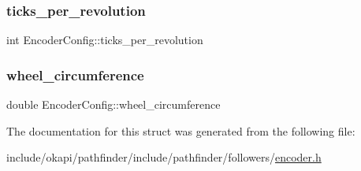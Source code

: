 \mbox{\label{structEncoderConfig_a2e0c8cadba598923ab9862073ad7be81}} 
\subsubsection{\texorpdfstring{ticks\_per\_revolution}{ticks\_per\_revolution}}
{\footnotesize\ttfamily int Encoder\+Config\+::ticks\+\_\+per\+\_\+revolution}

\mbox{\label{structEncoderConfig_af31ada23da9d2b7d4bb7fdaf6877bc00}} 
\subsubsection{\texorpdfstring{wheel\_circumference}{wheel\_circumference}}
{\footnotesize\ttfamily double Encoder\+Config\+::wheel\+\_\+circumference}



The documentation for this struct was generated from the following file\+:\begin{DoxyCompactItemize}
\item 
include/okapi/pathfinder/include/pathfinder/followers/\mbox{\hyperlink{encoder_8h}{encoder.\+h}}\end{DoxyCompactItemize}
